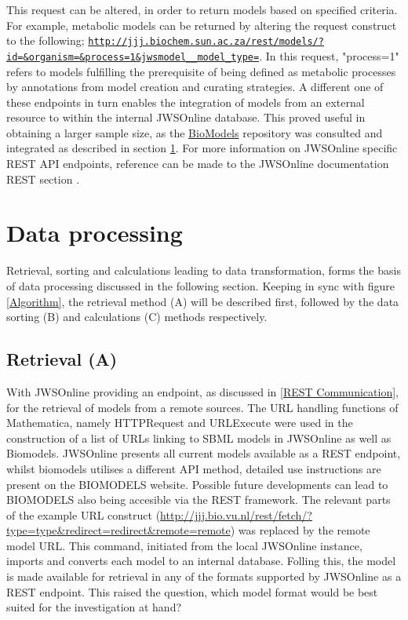 This request can be altered, in order to return models based on specified criteria. For example, metabolic models can be returned by altering the request construct to the following; \href{http://jjj.biochem.sun.ac.za/rest/models/?id=&organism=&process=1&jwsmodel__model_type=}{\nolinkurl{http://jjj.biochem.sun.ac.za/rest/models/?id=\&organism=\&process=1\&jwsmodel\_\_model\_type=}}. In this request, "process=1" refers to models fulfilling the prerequisite of being defined as metabolic processes by annotations from model creation and curating strategies. A different one of these endpoints in turn enables the integration of models from an external resource to within the internal JWSOnline database. This proved useful in obtaining a larger sample size, as the \href{https://www.ebi.ac.uk/biomodels-main/}{BioModels} repository was consulted and integrated as described in section \ref{Data processing}. For more information on JWSOnline specific REST API endpoints, reference can be made to the JWSOnline documentation REST section \cite{jwsdocs}. 

\section{Data processing} \label{Data processing}
Retrieval, sorting and calculations leading to data transformation, forms the basis of data processing discussed in the following section. Keeping in sync with figure \ref{Algorithm}, the retrieval method (A) will be described first, followed by the data sorting (B) and calculations (C) methods respectively. 

\subsection{Retrieval (A)} \label{Retrieval}
With JWSOnline providing an endpoint, as discussed in \ref{REST Communication}, for the retrieval of models from a remote sources. The URL handling functions of Mathematica, namely HTTPRequest and URLExecute were used in the construction of a list of URLs linking to SBML models in JWSOnline as well as Biomodels. JWSOnline presents all current models available as a REST endpoint, whilst biomodels utilises a different API method, detailed use instructions are present on the BIOMODELS website. Possible future developments can lead to BIOMODELS also being accesible via the REST framework. The relevant parts of the example URL construct (\href{http://jjj.bio.vu.nl/rest/fetch/?type={type}&redirect={redirect}&remote={remote}}{http://jjj.bio.vu.nl/rest/fetch/?type={type}&redirect={redirect}&remote={remote}}) was replaced by the remote model URL. This command, initiated from the local JWSOnline instance, imports and converts each model to an internal database. Folling this, the model is made available for retrieval in any of the formats supported by JWSOnline as a REST endpoint. This raised the question, which model format would be best suited for the investigation at hand?

